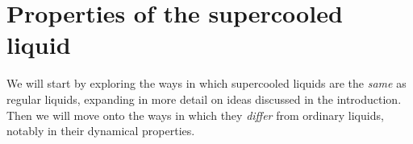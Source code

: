 \documentclass[11pt,twoside]{report}
\begin{document}


\section{Properties of the supercooled liquid}
\label{sec:glass-phenomenology}

We will start by exploring the ways in which supercooled liquids are the \emph{same} as regular liquids, expanding in more detail on ideas discussed in the introduction.
Then we will move onto the ways in which they \emph{differ} from ordinary liquids, notably in their dynamical properties.
\end{document}
